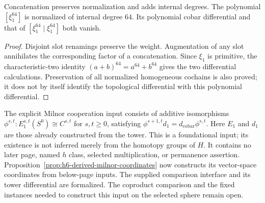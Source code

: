 \begin{proposition}
  \label{prop:h6-polynomial-cocycles}
  \leanok
  Concatenation preserves normalization and adds internal degrees.
  The polynomial $[\xi_1^{64}]$ is normalized of internal degree $64$.
  Its polynomial cobar differential and that of
  $[\xi_1^{64}\mid\xi_1^{64}]$ both vanish.
\end{proposition}
\begin{proof}
  Disjoint slot renamings preserve the weight. Augmentation of any slot
  annihilates the corresponding factor of a concatenation. Since
  $\xi_1$ is primitive, the characteristic-two identity
  $(a+b)^{64}=a^{64}+b^{64}$ gives the two differential calculations.
  Preservation of all normalized homogeneous cochains is also proved;
  it does not by itself identify the topological differential with this
  polynomial differential.
  \leanok
\end{proof}

\begin{definition}
  \label{def:h6-milnor-cooperations}
  \leanok
  The explicit Milnor cooperation input consists of additive isomorphisms
  $\phi^{s,t}:E_1^{s,t}(S^0)\cong C^{s,t}$ for $s,t\ge0$, satisfying
  $\phi^{s+1,t}d_1=d_{\mathrm{cobar}}\phi^{s,t}$.
  Here $E_1$ and $d_1$ are those already constructed from the tower.
  This is a foundational input; its existence is not inferred merely from
  the homotopy groups of $H$.  It contains no later page, named $h$ class,
  selected multiplication, or permanence assertion.
  Proposition~\ref{prop:h6-derived-milnor-coordinates} now constructs its
  vector-space coordinates from below-page inputs. The supplied comparison
  interface and its tower differential are formalized. The coproduct
  comparison and the fixed instances needed to construct this input on the
  selected sphere remain open.
\end{definition}

